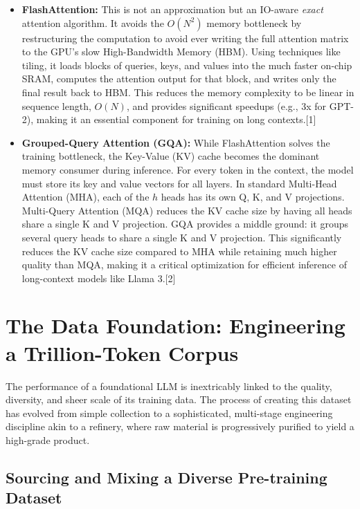 \documentclass[12pt, a4paper]{article}
\begin{document}
\begin{itemize}
    \item \textbf{FlashAttention:} This is not an approximation but an IO-aware \textit{exact} attention algorithm. It avoids the $O(N^2)$ memory bottleneck by restructuring the computation to avoid ever writing the full attention matrix to the GPU's slow High-Bandwidth Memory (HBM). Using techniques like tiling, it loads blocks of queries, keys, and values into the much faster on-chip SRAM, computes the attention output for that block, and writes only the final result back to HBM. This reduces the memory complexity to be linear in sequence length, $O(N)$, and provides significant speedups (e.g., 3x for GPT-2), making it an essential component for training on long contexts.[1]
    \item \textbf{Grouped-Query Attention (GQA):} While FlashAttention solves the training bottleneck, the Key-Value (KV) cache becomes the dominant memory consumer during inference. For every token in the context, the model must store its key and value vectors for all layers. In standard Multi-Head Attention (MHA), each of the $h$ heads has its own Q, K, and V projections. Multi-Query Attention (MQA) reduces the KV cache size by having all heads share a single K and V projection. GQA provides a middle ground: it groups several query heads to share a single K and V projection. This significantly reduces the KV cache size compared to MHA while retaining much higher quality than MQA, making it a critical optimization for efficient inference of long-context models like Llama 3.[2]
\end{itemize}

\section{The Data Foundation: Engineering a Trillion-Token Corpus}

The performance of a foundational LLM is inextricably linked to the quality, diversity, and sheer scale of its training data. The process of creating this dataset has evolved from simple collection to a sophisticated, multi-stage engineering discipline akin to a refinery, where raw material is progressively purified to yield a high-grade product.

\subsection{Sourcing and Mixing a Diverse Pre-training Dataset}
\end{document}

